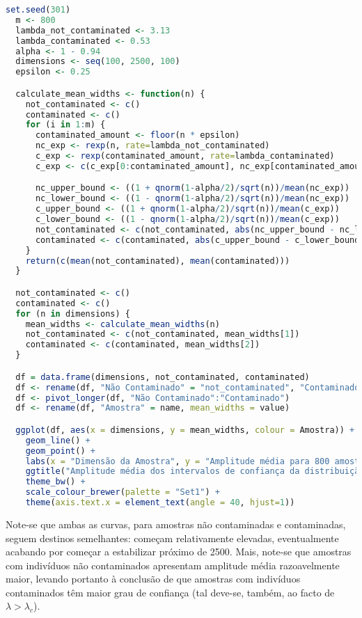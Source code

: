 \documentclass[10pt]{article}
\begin{document}
\begin{lstlisting}[language=R]
  set.seed(301)
  m <- 800
  lambda_not_contaminated <- 3.13
  lambda_contaminated <- 0.53
  alpha <- 1 - 0.94
  dimensions <- seq(100, 2500, 100)
  epsilon <- 0.25

  calculate_mean_widths <- function(n) {
    not_contaminated <- c()
    contaminated <- c()
    for (i in 1:m) {
      contaminated_amount <- floor(n * epsilon)
      nc_exp <- rexp(n, rate=lambda_not_contaminated)
      c_exp <- rexp(contaminated_amount, rate=lambda_contaminated)
      c_exp <- c(c_exp[0:contaminated_amount], nc_exp[contaminated_amount:n])

      nc_upper_bound <- ((1 + qnorm(1-alpha/2)/sqrt(n))/mean(nc_exp))
      nc_lower_bound <- ((1 - qnorm(1-alpha/2)/sqrt(n))/mean(nc_exp))
      c_upper_bound <- ((1 + qnorm(1-alpha/2)/sqrt(n))/mean(c_exp))
      c_lower_bound <- ((1 - qnorm(1-alpha/2)/sqrt(n))/mean(c_exp))
      not_contaminated <- c(not_contaminated, abs(nc_upper_bound - nc_lower_bound))
      contaminated <- c(contaminated, abs(c_upper_bound - c_lower_bound))
    }
    return(c(mean(not_contaminated), mean(contaminated)))
  }

  not_contaminated <- c()
  contaminated <- c()
  for (n in dimensions) {
    mean_widths <- calculate_mean_widths(n)
    not_contaminated <- c(not_contaminated, mean_widths[1])
    contaminated <- c(contaminated, mean_widths[2])
  }

  df = data.frame(dimensions, not_contaminated, contaminated)
  df <- rename(df, "Não Contaminado" = "not_contaminated", "Contaminado" = "contaminated")
  df <- pivot_longer(df, "Não Contaminado":"Contaminado")
  df <- rename(df, "Amostra" = name, mean_widths = value)

  ggplot(df, aes(x = dimensions, y = mean_widths, colour = Amostra)) +
    geom_line() +
    geom_point() +
    labs(x = "Dimensão da Amostra", y = "Amplitude média para 800 amostras") +
    ggtitle("Amplitude média dos intervalos de confiança da distribuição exponencial") +
    theme_bw() +
    scale_colour_brewer(palette = "Set1") +
    theme(axis.text.x = element_text(angle = 40, hjust=1))
\end{lstlisting}


Note-se que ambas as curvas, para amostras não contaminadas e contaminadas,
seguem destinos semelhantes: começam relativamente elevadas, eventualmente
acabando por começar a estabilizar próximo de 2500. Mais, note-se que amostras
com indivíduos não contaminados apresentam amplitude média razoavelmente maior, levando
portanto à conclusão de que amostras com indivíduos contaminados têm maior grau de confiança
(tal deve-se, também, ao facto de $\lambda > \lambda_c$).
\end{document}
